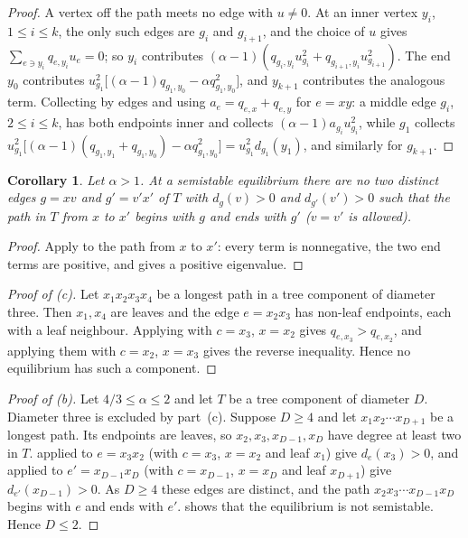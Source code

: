 \documentclass[11pt]{article}
\newtheorem{corollary}[theorem]{Corollary}
\theoremstyle{definition}
\theoremstyle{remark}
\begin{document}
\begin{proof}
A vertex off the path meets no edge with $u\ne 0$. At an inner vertex $y_i$, $1\le i\le k$, the only such edges are
$g_i$ and $g_{i+1}$, and the choice of $u$ gives $\sum_{e\ni y_i}q_{e,y_i}u_e=0$; so $y_i$ contributes
$(\alpha-1)(q_{g_i,y_i}u_{g_i}^2+q_{g_{i+1},y_i}u_{g_{i+1}}^2)$. The end $y_0$ contributes
$u_{g_1}^2\bigl[(\alpha-1)q_{g_1,y_0}-\alpha q_{g_1,y_0}^2\bigr]$, and $y_{k+1}$ contributes the analogous term.
Collecting by edges and using $a_e=q_{e,x}+q_{e,y}$ for $e=xy$: a middle edge $g_i$, $2\le i\le k$, has both endpoints inner and
collects $(\alpha-1)a_{g_i}u_{g_i}^2$, while $g_1$ collects
$u_{g_1}^2\bigl[(\alpha-1)(q_{g_1,y_1}+q_{g_1,y_0})-\alpha q_{g_1,y_0}^2\bigr]=u_{g_1}^2d_{g_1}(y_1)$, and similarly
for $g_{k+1}$.
\end{proof}

\begin{corollary}\label{cor:facing}
Let $\alpha>1$. At a semistable equilibrium there are no two distinct edges $g=xv$ and $g'=v'x'$ of $T$ with $d_g(v)>0$ and
$d_{g'}(v')>0$ such that the path in $T$ from $x$ to $x'$ begins with $g$ and ends with $g'$ ($v=v'$ is allowed).
\end{corollary}

\begin{proof}
Apply  to the path from $x$ to $x'$: every term is nonnegative, the two end terms are positive, and
 gives a positive eigenvalue.
\end{proof}

\begin{proof}[Proof of (c)]
Let $x_1x_2x_3x_4$ be a longest path in a tree component of diameter three. Then $x_1,x_4$ are leaves and the edge
$e=x_2x_3$ has non-leaf endpoints, each with a leaf neighbour. Applying  with $c=x_3$, $x=x_2$
gives $q_{e,x_3}>q_{e,x_2}$, and applying them with $c=x_2$, $x=x_3$ gives the reverse inequality. Hence no
equilibrium has such a component.
\end{proof}

\begin{proof}[Proof of (b)]
Let $4/3\le\alpha\le 2$ and let $T$ be a tree component of diameter $D$. Diameter three is excluded by part~(c).
Suppose $D\ge 4$ and let $x_1x_2\cdots x_{D+1}$ be a longest path. Its endpoints are leaves, so $x_2,x_3,x_{D-1},x_D$
have degree at least two in $T$.  applied to $e=x_3x_2$ (with $c=x_3$, $x=x_2$ and leaf $x_1$)
give $d_e(x_3)>0$, and applied to $e'=x_{D-1}x_D$ (with $c=x_{D-1}$, $x=x_D$ and leaf $x_{D+1}$) give
$d_{e'}(x_{D-1})>0$. As $D\ge 4$ these edges are distinct, and the path $x_2x_3\cdots x_{D-1}x_D$ begins with $e$
and ends with $e'$.  shows that the equilibrium is not semistable. Hence $D\le 2$.
\end{proof}
\end{document}
